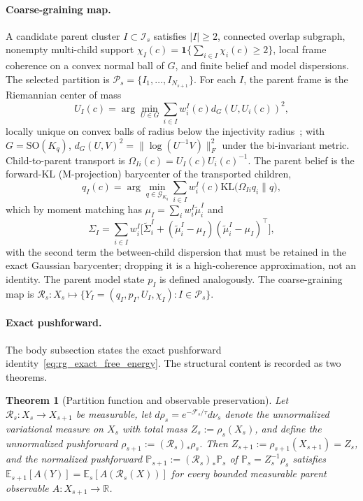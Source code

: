 \documentclass[11pt]{article}
\newtheorem{theorem}{Theorem}
\begin{document}
\paragraph{Coarse-graining map.}
A candidate parent cluster $I \subset \mathcal{I}_s$ satisfies $|I| \ge 2$, connected overlap subgraph, nonempty multi-child support $\chi_I(c) = \mathbf{1}\{\sum_{i \in I}\chi_i(c) \ge 2\}$, local frame coherence on a convex normal ball of $G$, and finite belief and model dispersions. The selected partition is $\mathcal{P}_s = \{I_1, \ldots, I_{N_{s+1}}\}$. For each $I$, the parent frame is the Riemannian center of mass
\begin{equation}
U_I(c) = \arg\min_{U \in G} \sum_{i \in I} w_i^I(c) d_G(U, U_i(c))^2,
\end{equation}
locally unique on convex balls of radius below the injectivity radius~\cite{karcher1977riemannian}; with $G = \mathrm{SO}(K_q)$, $d_G(U, V)^2 = \|\log(U^{-1}V)\|_F^2$ under the bi-invariant metric. Child-to-parent transport is $\Omega_{Ii}(c) = U_I(c)U_i(c)^{-1}$. The parent belief is the forward-KL (M-projection) barycenter of the transported children,
\begin{equation}
q_I(c) = \arg\min_{q \in \mathcal{G}_{K_q}} \sum_{i \in I} w_i^I(c) \mathrm{KL}\big(\Omega_{Ii}q_i \| q\big),
\end{equation}
which by moment matching has $\mu_I = \sum_i w_i^I \widetilde{\mu}_i^I$ and
\begin{equation}
\Sigma_I = \sum_{i \in I} w_i^I\big[\widetilde{\Sigma}_i^I + (\widetilde{\mu}_i^I - \mu_I)(\widetilde{\mu}_i^I - \mu_I)^\top\big],
\end{equation}
with the second term the between-child dispersion that must be retained in the exact Gaussian barycenter; dropping it is a high-coherence approximation, not an identity. The parent model state $p_I$ is defined analogously. The coarse-graining map is $\mathcal{R}_s : X_s \mapsto \{Y_I = (q_I, p_I, U_I, \chi_I) : I \in \mathcal{P}_s\}$.

\paragraph{Exact pushforward.}
The body subsection states the exact pushforward identity~\eqref{eq:rg_exact_free_energy}. The structural content is recorded as two theorems.

\begin{theorem}[Partition function and observable preservation]
\label{thm:rg_pushforward}
Let $\mathcal{R}_s : X_s \to X_{s+1}$ be measurable, let $d\rho_s = e^{-\mathcal{F}_s/\tau} d\nu_s$ denote the unnormalized variational measure on $X_s$ with total mass $Z_s := \rho_s(X_s)$, and define the unnormalized pushforward $\rho_{s+1} := (\mathcal{R}_s)_*\rho_s$. Then $Z_{s+1} := \rho_{s+1}(X_{s+1}) = Z_s$, and the normalized pushforward $\mathbb{P}_{s+1} := (\mathcal{R}_s)_*\mathbb{P}_s$ of $\mathbb{P}_s = Z_s^{-1}\rho_s$ satisfies $\mathbb{E}_{s+1}[A(Y)] = \mathbb{E}_s[A(\mathcal{R}_s(X))]$ for every bounded measurable parent observable $A : X_{s+1} \to \mathbb{R}$.
\end{theorem}
\end{document}
